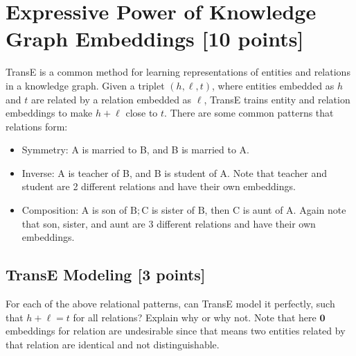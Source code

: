 \documentclass{article}
\numberwithin{figure}{section}
\begin{document}




\section{Expressive Power of Knowledge Graph Embeddings [10 points]}
TransE is a common method for learning representations of entities and relations in a knowledge graph. Given a triplet $(h, \ell, t)$, where entities embedded as $h$ and $t$ are related by a relation embedded as $\ell$, TransE trains entity and relation embeddings to make $h+\ell$ close to $t$. There are some common patterns that relations form:
\begin{itemize}
    \item Symmetry: A is married to B, and B is married to A.
    \item Inverse: A is teacher of B, and B is student of A. Note that teacher and student are 2 different relations and have their own embeddings.
    \item Composition: $\mathrm{A}$ is son of $\mathrm{B} ; \mathrm{C}$ is sister of $\mathrm{B}$, then $\mathrm{C}$ is aunt of $\mathrm{A}$. Again note that son, sister, and aunt are 3 different relations and have their own embeddings.
\end{itemize}
\subsection{TransE Modeling [3 points]}
For each of the above relational patterns, can TransE model it perfectly, such that $h+\ell=t$ for all relations? Explain why or why not. Note that here $\mathbf{0}$ embeddings for relation are undesirable since that means two entities related by that relation are identical and not distinguishable.
\end{document}
